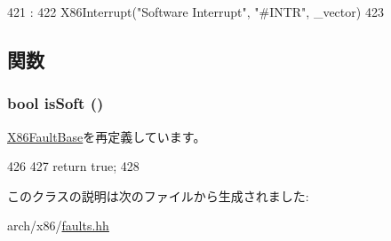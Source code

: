 \begin{DoxyCode}
421                                            :
422             X86Interrupt("Software Interrupt", "#INTR", _vector)
423         {}

\end{DoxyCode}


\subsection{関数}
\hypertarget{classX86ISA_1_1SoftwareInterrupt_aa6fbefd34fa168be687772f1e4498220}{
\subsubsection[{isSoft}]{\setlength{\rightskip}{0pt plus 5cm}bool isSoft ()}}
\label{classX86ISA_1_1SoftwareInterrupt_aa6fbefd34fa168be687772f1e4498220}


\hyperlink{classX86ISA_1_1X86FaultBase_a097619346ac87f9db97e3fdd59b81466}{X86FaultBase}を再定義しています。


\begin{DoxyCode}
426         {
427             return true;
428         }
\end{DoxyCode}


このクラスの説明は次のファイルから生成されました:\begin{DoxyCompactItemize}
\item 
arch/x86/\hyperlink{arch_2x86_2faults_8hh}{faults.hh}\end{DoxyCompactItemize}
